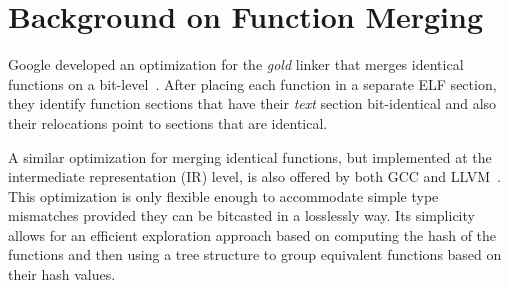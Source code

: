\section{Background on Function Merging} \label{sec:background}


Google developed an optimization for the \textit{gold} linker that merges
identical functions on a bit-level~\cite{tallam10,kwan12}.
After placing each function in a separate ELF section, they identify function
sections that have their \textit{text} section bit-identical and also their
relocations point to sections that are identical.

A similar optimization for merging identical functions, but implemented at the
intermediate representation (IR) level, is also offered by both GCC and
LLVM~\cite{llvm-fm,livska14}.
This optimization is only flexible enough to accommodate simple type mismatches
provided they can be bitcasted in a losslessly way.
Its simplicity allows for an efficient exploration approach based on computing
the hash of the functions and then using a tree structure to group equivalent
functions based on their hash values.

